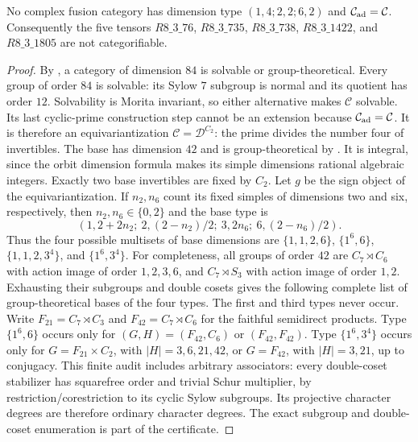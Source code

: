 \begin{theorem}\label{thm:m3-dimension84}
No complex fusion category has dimension type $(1,4;2,2;6,2)$ and
$\mathcal C_{\rm ad}=\mathcal C$. Consequently the five tensors
$R8\_3\_76$, $R8\_3\_735$, $R8\_3\_738$, $R8\_3\_1422$, and
$R8\_3\_1805$ are not categorifiable.
\end{theorem}
\begin{proof}
By \cite[Theorem~1.2]{DongWeak}, a category of dimension $84$ is
solvable or group-theoretical. Every group of order $84$ is solvable:
its Sylow $7$ subgroup is normal and its quotient has order $12$.
Solvability is Morita invariant, so either alternative makes
$\mathcal C$ solvable. Its last cyclic-prime construction step
\cite[Definition~1.2, Proposition~4.4]{ENOSolvable} cannot be an
extension because $\mathcal C_{\rm ad}=\mathcal C$. It is therefore
an equivariantization $\mathcal C=\mathcal D^{C_2}$: the prime divides
the number four of invertibles. The base has dimension $42$ and is
group-theoretical by \cite[Theorem~9.2]{ENOSolvable}. It is integral,
since the orbit dimension formula makes its simple dimensions rational
algebraic integers. Exactly two base invertibles are fixed by $C_2$.
Let $g$ be the sign object of the equivariantization. If $n_2,n_6$
count its fixed simples of dimensions two and six, respectively, then
$n_2,n_6\in\{0,2\}$ and the base type is
\[
 (1,2+2n_2;\ 2,(2-n_2)/2;\ 3,2n_6;\ 6,(2-n_6)/2).
\]
Thus the four possible multisets of base dimensions are
$\{1,1,2,6\}$, $\{1^6,6\}$, $\{1,1,2,3^4\}$, and $\{1^6,3^4\}$.
For completeness, all groups of order $42$ are $C_7\rtimes C_6$
with action image of order $1,2,3,6$, and $C_7\rtimes S_3$ with
action image of order $1,2$. Exhausting their subgroups and double
cosets gives the following complete list of group-theoretical bases
of the four types. The first and third types never occur. Write
$F_{21}=C_7\rtimes C_3$ and $F_{42}=C_7\rtimes C_6$ for the
faithful semidirect products. Type $\{1^6,6\}$ occurs only for
$(G,H)=(F_{42},C_6)$ or $(F_{42},F_{42})$. Type $\{1^6,3^4\}$
occurs only for $G=F_{21}\times C_2$, with $|H|=3,6,21,42$,
or $G=F_{42}$, with $|H|=3,21$, up to conjugacy.
This finite audit includes arbitrary associators: every double-coset
stabilizer has squarefree order and trivial Schur multiplier, by
restriction/corestriction to its cyclic Sylow subgroups. Its projective
character degrees are therefore ordinary character degrees. The exact
subgroup and double-coset enumeration is part of the certificate.

\end{proof}
